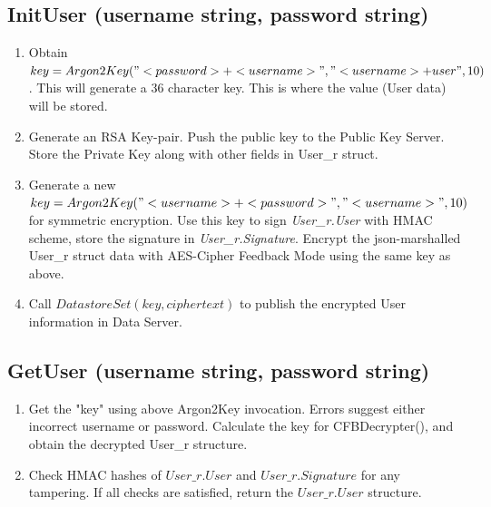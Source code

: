 \documentclass[a4paper, 12pt]{scrartcl}
\begin{document}
\subsection{InitUser (username string, password string)}
\begin{enumerate}
	\itemsep0em

	\item Obtain $key = Argon2Key("<password>+<username>", "<username>+user", 10)$. This will generate a 36 character key. This is where the value (User data) will be stored.
	\item Generate an RSA Key-pair. Push the public key to the Public Key Server. Store the Private Key along with other fields in User\_r struct.
	\item Generate a new $key = Argon2Key("<username>+<password>", "<username>", 10)$ for symmetric encryption. Use this key to sign \textit{User\_r.User} with HMAC scheme, store the signature in \textit{User\_r.Signature}. Encrypt the json-marshalled User\_r struct data with AES-Cipher Feedback Mode using the same key as above.
	\item Call $DatastoreSet(key, ciphertext)$ to publish the encrypted User information in Data Server.
\end{enumerate}

\subsection{GetUser (username string, password string)}
\begin{enumerate}
	\itemsep0em

	\item Get the "key" using above Argon2Key invocation. Errors suggest either incorrect username or password. Calculate the key for CFBDecrypter(), and obtain the decrypted User\_r structure.
	\item Check HMAC hashes of $User\_r.User$ and $User\_r.Signature$ for any tampering. If all checks are satisfied, return the $User\_r.User$ structure.
\end{enumerate}
\end{document}
